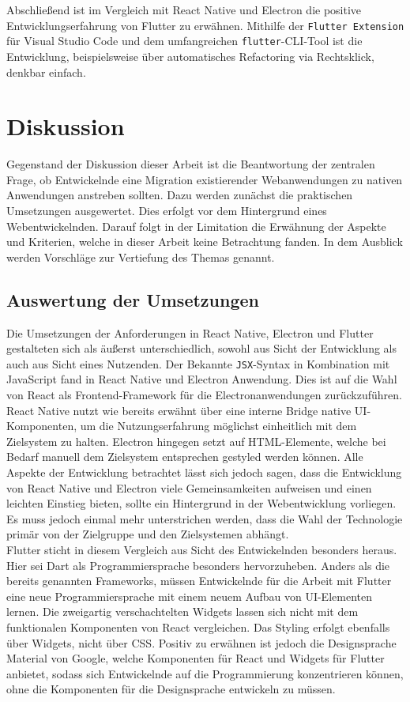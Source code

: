 \documentclass[a4paper]{scrartcl}
\begin{document}
Abschließend ist im Vergleich mit React Native und Electron die positive Entwicklungserfahrung von Flutter zu erwähnen. Mithilfe der \texttt{Flutter Extension} für Visual Studio Code und dem umfangreichen \texttt{flutter}-CLI-Tool ist die Entwicklung, beispielsweise über automatisches Refactoring via Rechtsklick, denkbar einfach.

\newpage

\section{Diskussion}

Gegenstand der Diskussion dieser Arbeit ist die Beantwortung der zentralen Frage, ob Entwickelnde eine Migration existierender Webanwendungen zu nativen Anwendungen anstreben sollten. Dazu werden zunächst die praktischen Umsetzungen ausgewertet. Dies erfolgt vor dem Hintergrund eines Webentwickelnden. Darauf folgt in der Limitation die Erwähnung der Aspekte und Kriterien, welche in dieser Arbeit keine Betrachtung fanden. In dem Ausblick werden Vorschläge zur Vertiefung des Themas genannt.

\subsection{Auswertung der Umsetzungen}

Die Umsetzungen der Anforderungen in React Native, Electron und Flutter gestalteten sich als äußerst unterschiedlich, sowohl aus Sicht der Entwicklung als auch aus Sicht eines Nutzenden. Der Bekannte \texttt{JSX}-Syntax in Kombination mit JavaScript fand in React Native und Electron Anwendung. Dies ist auf die Wahl von React als Frontend-Framework für die Electronanwendungen zurückzuführen. React Native nutzt wie bereits erwähnt über eine interne Bridge native UI-Komponenten, um die Nutzungserfahrung möglichst einheitlich mit dem Zielsystem zu halten. Electron hingegen setzt auf HTML-Elemente, welche bei Bedarf manuell dem Zielsystem entsprechen gestyled werden können. Alle Aspekte der Entwicklung betrachtet lässt sich jedoch sagen, dass die Entwicklung von React Native und Electron viele Gemeinsamkeiten aufweisen und einen leichten Einstieg bieten, sollte ein Hintergrund in der Webentwicklung vorliegen. Es muss jedoch einmal mehr unterstrichen werden, dass die Wahl der Technologie primär von der Zielgruppe und den Zielsystemen abhängt. \\
Flutter sticht in diesem Vergleich aus Sicht des Entwickelnden besonders heraus. Hier sei Dart als Programmiersprache besonders hervorzuheben. Anders als die bereits genannten Frameworks, müssen Entwickelnde für die Arbeit mit Flutter eine neue Programmiersprache mit einem neuem Aufbau von UI-Elementen lernen. Die zweigartig verschachtelten Widgets lassen sich nicht mit dem funktionalen Komponenten von React vergleichen. Das Styling erfolgt ebenfalls über Widgets, nicht über CSS. Positiv zu erwähnen ist jedoch die Designsprache Material von Google, welche Komponenten für React und Widgets für Flutter anbietet, sodass sich Entwickelnde auf die Programmierung konzentrieren können, ohne die Komponenten für die Designsprache entwickeln zu müssen. \\
\end{document}
